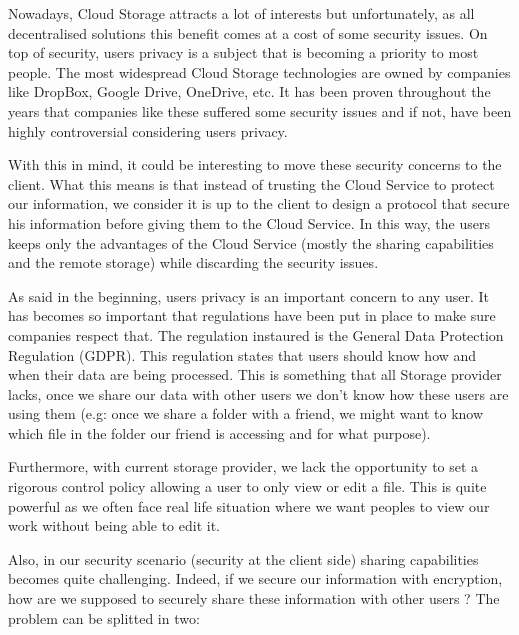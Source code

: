 \documentclass[../main.tex]{subfiles}
\begin{document}


\par Nowadays, Cloud Storage attracts a lot of interests but unfortunately, as all decentralised solutions this benefit comes at a cost of some security issues. On top of security, users privacy is a subject that is becoming a priority to most people. The most widespread Cloud Storage technologies are owned by companies like DropBox, Google Drive, OneDrive, etc. It has been proven throughout the years that companies like these suffered some security issues and if not, have been highly controversial considering users privacy.
\par With this in mind, it could be interesting to move these security concerns to the client. What this means is that instead of trusting the Cloud Service to protect our information, we consider it is up to the client to design a protocol that secure his information before giving them to the Cloud Service. In this way, the users keeps only the advantages of the Cloud Service (mostly the sharing capabilities and the remote storage) while discarding the security issues.
\par As said in the beginning, users privacy is an important concern to any user. It has becomes so important that regulations have been put in place to make sure companies respect that. The regulation instaured is the General Data Protection Regulation (GDPR). This regulation states that users should know how and when their data are being processed. This is something that all Storage provider lacks, once we share our data with other users we don't know how these users are using them (e.g: once we share a folder with a friend, we might want to know which file in the folder our friend is accessing and for what purpose).
\par Furthermore, with current storage provider, we lack the opportunity to set a rigorous control policy allowing a user to only view or edit a file. This is quite powerful as we often face real life situation where we want peoples to view our work without being able to edit it.
\par Also, in our security scenario (security at the client side) sharing capabilities becomes quite challenging. Indeed, if we secure our information with encryption, how are we supposed to securely share these information with other users ? The problem can be splitted in two: 
\end{document}
